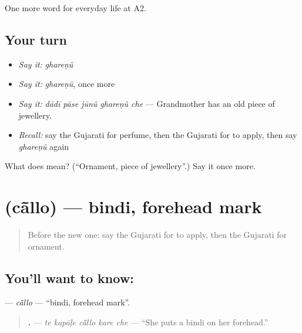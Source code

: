 \begin{grammarlens}[title={What you've built}]
One more word for everyday life at A2.
\end{grammarlens}

\subsection*{Your turn}
\begin{itemize}
\raggedright
  \item \emph{Say it:} \emph{ghareṇũ}
  \item \emph{Say it:} \emph{ghareṇũ}, once more
  \item \emph{Say it:} \emph{dādī pāse jūnũ ghareṇũ che} — Grandmother has an old piece of jewellery.
  \item \emph{Recall:} say the Gujarati for perfume, then the Gujarati for to apply, then say \emph{ghareṇũ} again
\end{itemize}

\begin{tcolorbox}[breakable,colback=teal!4,colframe=teal!35!black,title={Before you move on}]
What does  mean? (\textquotedblleft{}Ornament, piece of jewellery\textquotedblright{}.) Say it once more.
\end{tcolorbox}
\section[\texorpdfstring{\gu{ચાંલ્લો} (cā̃llo)}{ચાંલ્લો (cā̃llo)}]{ (cā̃llo) — bindi, forehead mark}

\label{lesson:GU-C156-callo}



\begin{quote}
Before the new one: say the Gujarati for to apply, then the Gujarati for ornament.
\end{quote}

\subsection*{You'll want to know: }
\textbf{} — \emph{cā̃llo} — \textquotedblleft{}bindi, forehead mark\textquotedblright{}.

\begin{quote}
\textbf{    .} — \emph{te kapāḷe cā̃llo kare che} — \textquotedblleft{}She puts a bindi on her forehead.\textquotedblright{}
\end{quote}

